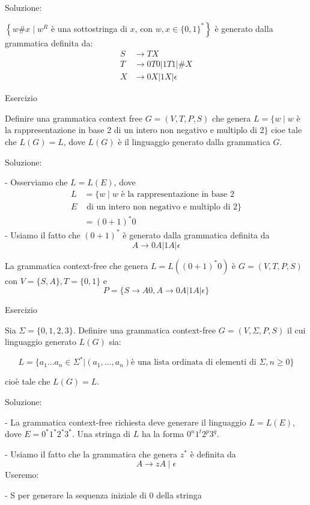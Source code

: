 Soluzione:

$\left\{w \# x \mid w^{R}\right.$ è una sottostringa di $x$, con $\left.w, x \in\{0,1\}^{*}\right\}$ è generato dalla grammatica definita da:
$$
\begin{aligned}
S & \rightarrow T X \\
T & \rightarrow 0 T 0|1 T 1| \# X \\
X & \rightarrow 0 X|1 X| \epsilon
\end{aligned}
$$

Esercizio

Definire una grammatica context free $G=(V, T, P, S)$ che genera
$L=\{w \mid w$ è la rappresentazione in base 2
di un intero non negativo e multiplo di 2$\}$
cioe tale che $L(G)=L$, dove $L(G)$ è il linguaggio generato dalla grammatica $G$.

Soluzione:

- Osserviamo che $L=L(E)$, dove
$$
\begin{aligned}
L &=\{w \mid w \text { è la rappresentazione in base } 2\\
E &\text { di un intero non negativo e multiplo di } 2\} \\
&=(0+1)^{*} 0
\end{aligned}
$$
- Usiamo il fatto che $(0+1)^{*}$ è generato dalla grammatica definita da
$$
A \rightarrow 0 A|1 A| \epsilon
$$

La grammatica context-free che genera $L=L\left((0+1)^{*} 0\right)$ è $G=(V, T, P, S)$ con $V=\{S, A\}, T=\{0,1\}$ e
$$
P=\{S \rightarrow A 0, A \rightarrow 0 A|1 A| \epsilon\}
$$

Esercizio

Sia $\Sigma=\{0,1,2,3\}$. Definire una grammatica context-free $G=(V, \Sigma, P, S)$ il cui linguaggio generato $L(G)$ sia:

$$
L = \{a_1 \dots a_n \in \Sigma^{*} | (a_1, \dots, a_n) \text{è una lista ordinata di elementi di } \Sigma , n \geq 0\}
$$

cioè tale che $L(G)=L$.

Soluzione:

- La grammatica context-free richiesta deve generare il linguaggio $L=L(E)$, dove $E=0^{*} 1^{*} 2^{*} 3^{*}$. Una stringa di $L$ ha la forma $0^{n} 1^{t} 2^{p} 3^{q}$.

- Usiamo il fatto che la grammatica che genera $z^{*}$ è definita da
$$
A \rightarrow z A \mid \epsilon
$$
Useremo:

- S per generare la sequenza iniziale di 0 della stringa

